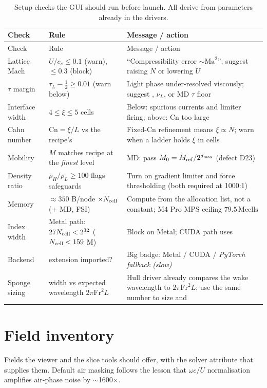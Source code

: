 \documentclass[11pt,a4paper]{article}
\newcommand{\Ma}{\mathrm{Ma}}
\newcommand{\Fr}{\mathrm{Fr}}
\newcommand{\Cn}{\mathrm{Cn}}
\newcommand{\cs}{c_s}
\newcommand{\Mcells}{\,\mathrm{Mcells}}
\begin{document}
\begin{longtable}{L{3.6cm}L{4.2cm}L{7.2cm}}
\caption{Setup checks the GUI should run before launch. All derive from
parameters already in the drivers.}\\
\toprule
Check & Rule & Message / action \\
\midrule
\endfirsthead
\toprule
Check & Rule & Message / action \\
\midrule
\endhead
Lattice Mach & $U/\cs \le 0.1$ (warn), $\le 0.3$ (block) & ``Compressibility error $\sim\Ma^2$''; suggest raising $N$ or lowering $U$ \\
$\tau$ margin & $\tau_L - \tfrac12 \ge 0.01$ (warn below) & Light phase under-resolved viscously; suggest , $\nu_L$, or MD $\tau$ floor \\
Interface width & $4 \le \xi \le 5$ cells & Below: spurious currents and limiter firing; above: $\Cn$ too large \\
Cahn number & $\Cn=\xi/L$ vs the recipe's & Fixed-$\Cn$ refinement means $\xi\propto N$; warn when a ladder holds $\xi$ in cells \\
Mobility & $M$ matches recipe at the \emph{finest} level & MD: pass $M_0 = M_{\rm ref}/2^{d_{\max}}$ (defect D23) \\
Density ratio & $\rho_H/\rho_L \ge 100$ flags safeguards & Turn on gradient limiter and force thresholding (both required at 1000:1) \\
Memory & $\approx 350$ B/node $\times N_{\rm cell}$ (+ MD, FSI) & Compute from the allocation list, not a constant; M4 Pro MPS ceiling $79.5\Mcells$ \\
Index width & Metal path: $27 N_{\rm cell} < 2^{32}$ ($N_{\rm cell} < 159$ M) & Block on Metal; CUDA path uses  \\
Backend & extension imported? & Big badge: Metal / CUDA / \emph{PyTorch fallback (slow)} \\
Sponge sizing & width vs expected wavelength $2\pi\Fr^2 L$ & Hull driver already compares the wake wavelength to $2\pi\Fr^2L$; use the same number to size  and  \\
\bottomrule
\end{longtable}

\section{Field inventory}\label{sec:fields}
Fields the viewer and the slice tools should offer, with the solver attribute that
supplies them. Default air masking follows the lesson that $\omega c/U$ normalisation
amplifies air-phase noise by $\sim$1600$\times$.
\end{document}
